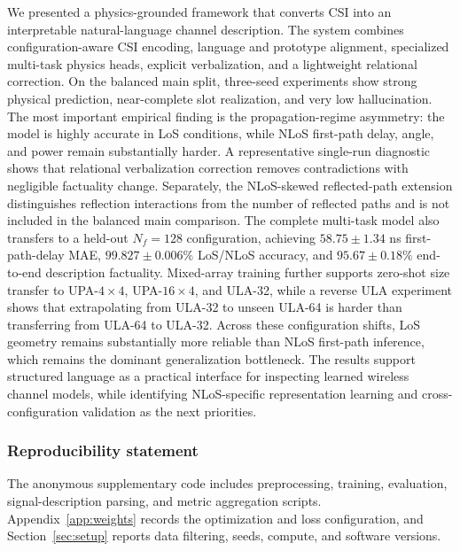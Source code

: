 \documentclass{article}
\begin{document}
We presented a physics-grounded framework that converts CSI into an interpretable natural-language channel description.
The system combines configuration-aware CSI encoding, language and prototype alignment, specialized multi-task physics heads, explicit verbalization, and a lightweight relational correction.
On the balanced main split, three-seed experiments show strong physical prediction, near-complete slot realization, and very low hallucination.
The most important empirical finding is the propagation-regime asymmetry: the model is highly accurate in LoS conditions, while NLoS first-path delay, angle, and power remain substantially harder.
A representative single-run diagnostic shows that relational verbalization correction removes contradictions with negligible factuality change.
Separately, the NLoS-skewed reflected-path extension distinguishes reflection interactions from the number of reflected paths and is not included in the balanced main comparison.
The complete multi-task model also transfers to a held-out $N_f=128$ configuration, achieving $58.75\pm1.34$ ns first-path-delay MAE, $99.827\pm0.006\%$ LoS/NLoS accuracy, and $95.67\pm0.18\%$ end-to-end description factuality.
Mixed-array training further supports zero-shot size transfer to UPA-$4{\times}4$, UPA-$16{\times}4$, and ULA-32, while a reverse ULA experiment shows that extrapolating from ULA-32 to unseen ULA-64 is harder than transferring from ULA-64 to ULA-32.
Across these configuration shifts, LoS geometry remains substantially more reliable than NLoS first-path inference, which remains the dominant generalization bottleneck.
The results support structured language as a practical interface for inspecting learned wireless channel models, while identifying NLoS-specific representation learning and cross-configuration validation as the next priorities.

\subsubsection*{Reproducibility statement}
The anonymous supplementary code includes preprocessing, training, evaluation, signal-description parsing, and metric aggregation scripts.
Appendix~\ref{app:weights} records the optimization and loss configuration, and Section~\ref{sec:setup} reports data filtering, seeds, compute, and software versions.




\appendix
\end{document}
